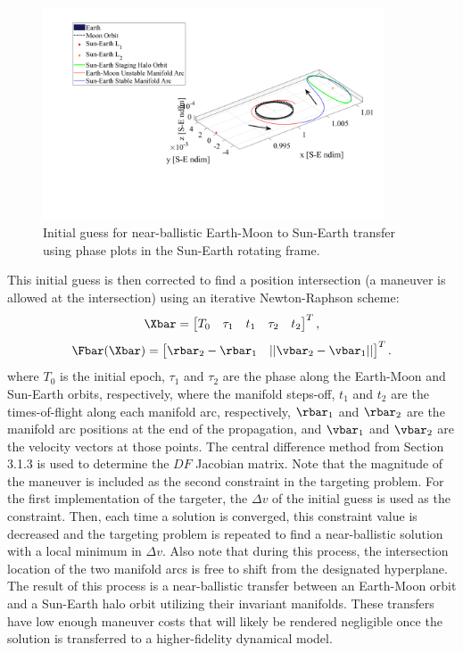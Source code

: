 \begin{figure}[ht]
    \centering
    \includegraphics[width=0.9\textwidth]{figures/InitialGuess.pdf}
    \caption{Initial guess for near-ballistic Earth-Moon to Sun-Earth transfer using phase plots in the Sun-Earth rotating frame.}
    \label{fig:initialGuess}
\end{figure}

This initial guess is then corrected to find a position intersection (a maneuver is allowed at the
intersection) using an iterative Newton-Raphson scheme:
\begin{equation}
    \Xbar=\begin{bmatrix}   T_{0}   &   \tau_{1}    &   t_{1}   &   \tau_{2}    &   t_{2}   \end{bmatrix}^{T},
    \label{eq:nbfreevar}
\end{equation}
\begin{equation}
    \Fbar(\Xbar)=\begin{bmatrix}    \rbar_{2}-\rbar_{1} &   ||\vbar_{2}-\vbar_{1}|| \end{bmatrix}^{T}.
    \label{eq:nbconst}
\end{equation}
where $T_{0}$ is the initial epoch, $\tau_{1}$ and $\tau_{2}$ are the phase along the Earth-Moon
and Sun-Earth orbits, respectively, where the manifold steps-off, $t_{1}$ and $t_{2}$ are the
times-of-flight along each manifold arc, respectively, $\rbar_{1}$ and $\rbar_{2}$ are the manifold
arc positions at the end of the propagation, and $\vbar_{1}$ and $\vbar_{2}$ are the velocity
vectors at those points. The central difference method from Section 3.1.3 is used to determine the
$DF$ Jacobian matrix. Note that the magnitude of the maneuver is included as the second constraint
in the targeting problem. For the first implementation of the targeter, the $\Delta v$ of the
initial guess is used as the constraint. Then, each time a solution is converged, this constraint
value is decreased and the targeting problem is repeated to find a near-ballistic solution with a
local minimum in $\Delta v$. Also note that during this process, the intersection location of the
two manifold arcs is free to shift from the designated hyperplane. The result of this process is a
near-ballistic transfer between an Earth-Moon orbit and a Sun-Earth halo orbit utilizing their
invariant manifolds. These transfers have low enough maneuver costs that will likely be rendered
negligible once the solution is transferred to a higher-fidelity dynamical model.

